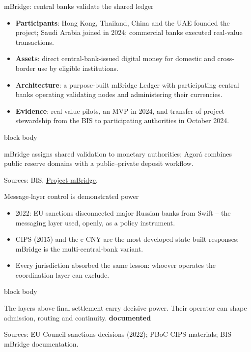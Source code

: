 \documentclass[aspectratio=169,12pt]{beamer}
\newcommand{\rust}[1]{\textcolor{Rust}{\textbf{#1}}}
\newcommand{\source}[1]{\vfill\par\fontsize{5.4}{6.5}\selectfont\color{Quiet}Sources: #1}
\newcommand{\tightitems}{\setlength{\itemsep}{0.42em}\setlength{\parskip}{0pt}}
\newcommand{\tdoc}{\textcolor{Sage}{\bfseries documented}}
\newenvironment{statement}{%
  \begin{beamercolorbox}[sep=.18cm,rounded=false,wd=\linewidth]{block body}%
  \fontsize{13}{15.5}\selectfont\bfseries
}{\end{beamercolorbox}}
\begin{document}
\begin{frame}[shrink=12]{mBridge: central banks validate the shared ledger}
  \begin{itemize}\tightitems
    \item \rust{Participants}: Hong Kong, Thailand, China and the UAE founded the project; Saudi Arabia joined in 2024; commercial banks executed real-value transactions.
    \item \rust{Assets}: direct central-bank-issued digital money for domestic and cross-border use by eligible institutions.
    \item \rust{Architecture}: a purpose-built mBridge Ledger with participating central banks operating validating nodes and administering their currencies.
    \item \rust{Evidence}: real-value pilots, an MVP in 2024, and transfer of project stewardship from the BIS to participating authorities in October 2024.
  \end{itemize}
  \begin{statement}
    mBridge assigns shared validation to monetary authorities; Agor\'a combines public reserve domains with a public--private deposit workflow.
  \end{statement}
  \source{BIS, \href{https://www.bis.org/about/bisih/topics/cbdc/mcbdc_bridge.htm}{Project mBridge}.}
\end{frame}

\begin{frame}{Message-layer control is demonstrated power}
  \begin{itemize}\tightitems
    \item 2022: EU sanctions disconnected major Russian banks from Swift -- the messaging layer used, openly, as a policy instrument.
    \item CIPS (2015) and the e-CNY are the most developed state-built responses; mBridge is the multi-central-bank variant.
    \item Every jurisdiction absorbed the same lesson: whoever operates the coordination layer can exclude.
  \end{itemize}
  \vspace{0.28cm}
  \begin{statement}
    The layers above final settlement carry decisive power. Their operator can shape admission, routing and continuity. \hfill\tdoc
  \end{statement}
  \source{EU Council sanctions decisions (2022); PBoC CIPS materials; BIS mBridge documentation.}
\end{frame}
\end{document}
